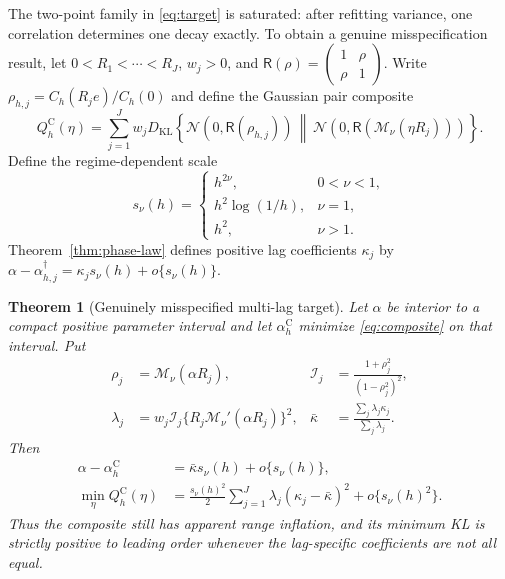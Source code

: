\documentclass[sigconf]{acmart}
\newtheorem{theorem}{Theorem}
\theoremstyle{remark}
\newcommand{\Matern}{\mathcal M}
\newcommand{\KL}{D_{\mathrm{KL}}}
\newcommand{\Normal}{\mathcal N}
\begin{document}
The two-point family in \eqref{eq:target} is saturated: after refitting variance,
one correlation determines one decay exactly. To obtain a genuine
misspecification result, let \(0<R_1<\cdots<R_J\), \(w_j>0\), and
\(\mathsf R(\rho)=\left(\begin{smallmatrix}1&\rho\\\rho&1\end{smallmatrix}\right)\).
Write \(\rho_{h,j}=C_h(R_j e)/C_h(0)\) and define the Gaussian pair composite
\begin{equation}
 Q_h^{\mathrm C}(\eta)=\sum_{j=1}^J w_j
 \KL\!\left\{\Normal(0,\mathsf R(\rho_{h,j}))\,\middle\|\,
 \Normal(0,\mathsf R(\Matern_\nu(\eta R_j)))\right\}.
 \label{eq:composite}
\end{equation}
Define the regime-dependent scale
\begin{equation}
s_\nu(h)=
\begin{cases}
h^{2\nu},&0<\nu<1,\\
h^2\log(1/h),&\nu=1,\\
h^2,&\nu>1.
\end{cases}
\label{eq:phase-scale}
\end{equation}
Theorem~\ref{thm:phase-law} defines positive lag coefficients \(\kappa_j\) by
\(\alpha-\alpha_{h,j}^\dagger=\kappa_j s_\nu(h)+o\{s_\nu(h)\}\).

\begin{theorem}[Genuinely misspecified multi-lag target]
\label{thm:multilag}
Let \(\alpha\) be interior to a compact positive parameter interval and let
\(\alpha_h^{\mathrm C}\) minimize \eqref{eq:composite} on that interval. Put
\begin{align}
 \rho_j&=\Matern_\nu(\alpha R_j),&
 \mathcal I_j&=\frac{1+\rho_j^2}{(1-\rho_j^2)^2},\\
 \lambda_j&=w_j\mathcal I_j\{R_j\Matern_\nu'(\alpha R_j)\}^2,&
 \bar\kappa&=\frac{\sum_j\lambda_j\kappa_j}{\sum_j\lambda_j}.
\end{align}
Then
\begin{align}
 \alpha-\alpha_h^{\mathrm C}&=\bar\kappa s_\nu(h)+o\{s_\nu(h)\},
 \label{eq:multilag-shift}\\
 \min_\eta Q_h^{\mathrm C}(\eta)
 &=\frac{s_\nu(h)^2}{2}
 \sum_{j=1}^J\lambda_j(\kappa_j-\bar\kappa)^2+o\{s_\nu(h)^2\}.
 \label{eq:multilag-kl}
\end{align}
Thus the composite still has apparent range inflation, and its minimum KL is
strictly positive to leading order whenever the lag-specific coefficients are
not all equal.
\end{theorem}
\end{document}

